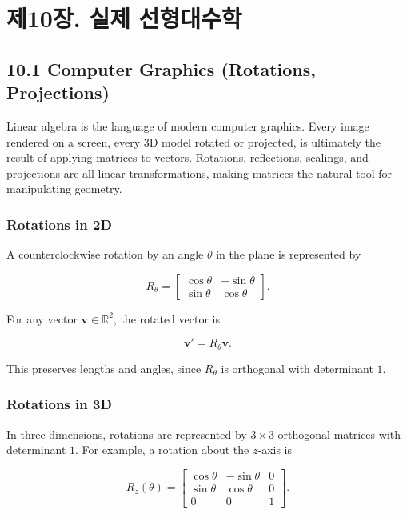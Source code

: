 \documentclass[
  12pt,
  a4paper,
]{article}
\let\oldsection\section
\renewcommand{\section}{\clearpage\oldsection}
\begin{document}
\section{제10장. 실제 선형대수학}\label{chapter-10-linear-algebra-in-practice}

\subsection{10.1 Computer Graphics (Rotations,
Projections)}\label{101-computer-graphics-rotations-projections}

Linear algebra is the language of modern computer graphics. Every image
rendered on a screen, every 3D model rotated or projected, is ultimately
the result of applying matrices to vectors. Rotations, reflections,
scalings, and projections are all linear transformations, making
matrices the natural tool for manipulating geometry.

\subsubsection{Rotations in 2D}\label{rotations-in-2d}

A counterclockwise rotation by an angle \(\theta\) in the plane is
represented by

\[R_\theta = 
\begin{bmatrix}
\cos\theta & -\sin\theta \\
\sin\theta & \cos\theta
\end{bmatrix}.\]

For any vector \(\mathbf{v} \in \mathbb{R}^2\), the rotated vector is

\[\mathbf{v}' = R_\theta \mathbf{v}.\]

This preserves lengths and angles, since \(R_\theta\) is orthogonal with
determinant \(1\).

\subsubsection{Rotations in 3D}\label{rotations-in-3d}

In three dimensions, rotations are represented by \(3 \times 3\)
orthogonal matrices with determinant \(1\). For example, a rotation
about the \(z\)-axis is

\[R_z(\theta) = 
\begin{bmatrix}
\cos\theta & -\sin\theta & 0 \\
\sin\theta & \cos\theta & 0 \\
0 & 0 & 1
\end{bmatrix}.\]
\end{document}
